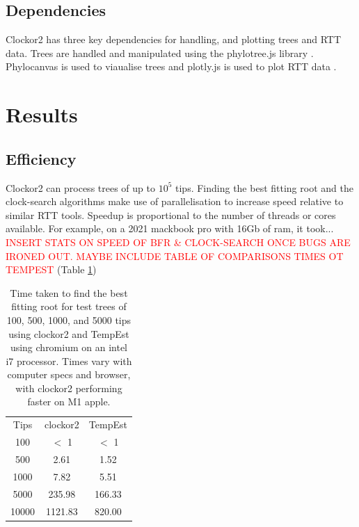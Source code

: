 \documentclass{article}
\begin{document}
\subsection*{Dependencies}
Clockor2 has three key dependencies for handling, and plotting trees and RTT data. Trees are handled and manipulated using the phylotree.js library \citep{shank_phylotreejs_2018}. Phylocanvas is used to viaualise trees and plotly.js is used to plot RTT data \citep{abudahab_phylocanvasgl_2021}.



\section*{Results}
\subsection*{Efficiency}
Clockor2 can process trees of up to $10^5$ tips. Finding the best fitting root and the clock-search algorithms make use of parallelisation to increase speed relative to similar RTT tools. Speedup is proportional to the number of threads or cores available. For example, on a 2021 mackbook pro with 16Gb of ram, it took... \textcolor{red}{INSERT STATS ON SPEED OF BFR & CLOCK-SEARCH ONCE BUGS ARE IRONED OUT. MAYBE INCLUDE TABLE OF COMPARISONS TIMES OT TEMPEST} (Table \ref{tab:bfr})

\begin{table}[H]
    \centering
    \begin{tabular}{c|c|c}
        Tips & clockor2 & TempEst \\
        100 & $<$ 1  & $<$ 1  \\
        500 & 2.61 & 1.52   \\
        1000 & 7.82  & 5.51 \\
        5000 &  235.98 & 166.33 \\
        10000 &  1121.83 & 820.00   \\
    \end{tabular}
    \caption{Time taken to find the best fitting root for test trees of 100, 500, 1000, and 5000 tips using clockor2 and TempEst using chromium on an intel i7 processor. Times vary with computer specs and browser, with clockor2 performing faster on M1 apple.}
    \label{tab:bfr}
\end{table}
\end{document}
